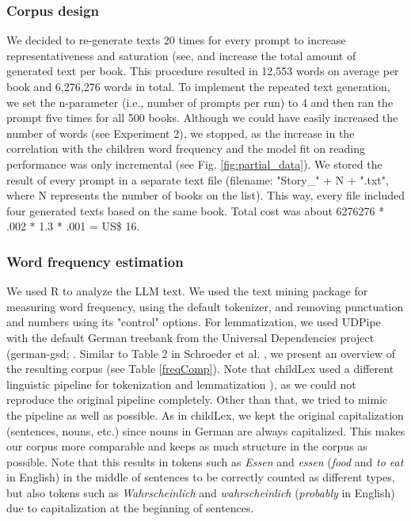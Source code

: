 \documentclass[doc, a4paper]{apa7}
\begin{document}
\subsubsection*{Corpus design}

We decided to re-generate texts 20 times for every prompt to increase representativeness and saturation (see, \citep{schnell_understanding_2021} and increase the total amount of generated text per book. This procedure resulted in 12,553 words on average per book and 6,276,276 words in total. To implement the repeated text generation, we set the n-parameter (i.e., number of prompts per run) to 4 and then ran the prompt five times for all 500 books. Although we could have easily increased the number of words (see Experiment 2), we stopped, as the increase in the correlation with the children word frequency and the model fit on reading performance was only incremental (see Fig. \ref{fig:partial_data}). We stored the result of every prompt in a separate text file (filename: "Story\_" + N + ".txt", where N represents the number of books on the list). This way, every file included four generated texts based on the same book. Total cost was about 6276276 * .002 * 1.3 * .001 = US\$ 16. 


\subsubsection*{Word frequency estimation}

We used R to analyze the LLM text. We used the text mining package \citep[tm; ][]{feinerer_text_2008} for measuring word frequency, using the default tokenizer, and removing punctuation and numbers using its "control" options. For lemmatization, we used UDPipe \citep{straka_tokenizing_2017} with the default German treebank from the Universal Dependencies project (german-gsd; \citep{mcdonald_universal_2013}. Similar to Table 2 in Schroeder et al. \citep{schroeder_childlex_2015}, we present an overview of the resulting corpus (see Table \ref{freqComp}). Note that childLex used a different linguistic pipeline for tokenization and lemmatization \citep[i.e., based on][]{jurish_word_2013, yli-jyra_tagh_2006}), as we could not reproduce the original pipeline completely. Other than that, we tried to mimic the pipeline as well as possible. 
As in childLex, we kept the original capitalization (sentences, nouns, etc.) since nouns in German are always capitalized. This makes our corpus more comparable and keeps as much structure in the corpus as possible. Note that this results in tokens such as \textit{Essen} and \textit{essen} (\textit{food} and \textit{to eat} in English) in the middle of sentences to be correctly counted as different types, but also tokens such as \textit{Wahrscheinlich} and \textit{wahrscheinlich} (\textit{probably} in English) due to capitalization at the beginning of sentences. 
\end{document}
